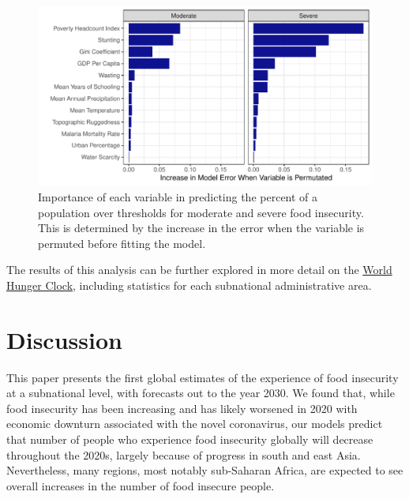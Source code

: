 \documentclass{article}
\begin{document}
\begin{figure}[h]
  \centering
  \includegraphics[width=\linewidth]{img/VIMP.pdf}
  \caption{Importance of each variable in predicting the percent of a population over thresholds for moderate and severe food insecurity.  This is determined by the increase in the error when the variable is permuted before fitting the model.}
  \label{fig:map}
\end{figure}


The results of this analysis can be further explored in more detail on the \href{https://worldhunger.io}{World Hunger Clock}, including statistics for each subnational administrative area.

\section{Discussion}
This paper presents the first global estimates of the experience of food insecurity at a subnational level, with forecasts out to the year 2030.  We found that, while food insecurity has been increasing and has likely worsened in 2020 with economic downturn associated with the novel coronavirus, our models predict that number of people who experience food insecurity globally will decrease throughout the 2020s, largely because of progress in south and east Asia.  Nevertheless, many regions, most notably sub-Saharan Africa, are expected to see overall increases in the number of food insecure people. 
\end{document}
